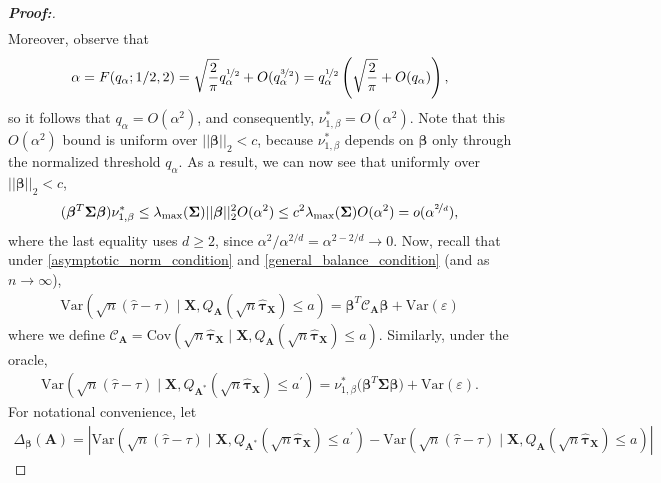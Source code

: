 \documentclass[11pt,twoside]{article}
\theoremstyle{definition}
\theoremstyle{remark}
\begin{document}
\begin{proof}[\textbf{Proof:}]
\begin{align*}
\end{align*}
Moreover, observe that
\begin{align*}
     \alpha = F(q_\alpha;1/2,2) = \sqrt{\frac{2}{\pi}}q_\alpha^{\nicefrac{1}{2}} + O(q_\alpha^{\nicefrac{3}{2}}) = q_\alpha^{\nicefrac{1}{2}} \left( \sqrt{\frac{2}{\pi}} + O(q_\alpha) \right),
\end{align*}
so it follows that $q_\alpha=O(\alpha^2)$, and consequently, $\nu^*_{1,\beta}=O(\alpha^2)$. Note that this $O(\alpha^2)$ bound is uniform over $||\bm{\beta}||_2<c$, because $\nu^*_{1,\beta}$ depends on $\bm{\beta}$ only through the normalized
threshold $q_\alpha$. As a result, we can now see that uniformly over $|| \bm{\beta}||_2 < c$,
\begin{align*}
    (\bm{\beta}^T \mathbf{\Sigma} \bm{\beta})\nu^*_{1,\beta} \leq \lambda_{\max}(\mathbf{\Sigma}) ||\bm{\beta}||_2^2 O(\alpha^2) \notag \leq c^2\lambda_{\max}(\mathbf{\Sigma})O(\alpha^2) = o(\alpha^{\nicefrac{2}{d}}),
\end{align*}
where the last equality uses $d\geq2$, since $\alpha^2/\alpha^{2/d}=\alpha^{2-2/d}\to0$. Now, recall that under \cref{asymptotic_norm_condition} and \cref{general_balance_condition} (and as $n \to \infty$),
\begin{align*}
    \text{Var}\left(\sqrt{n}(\widehat{\tau} - \tau) \mid \mathbf{X}, Q_{\mathbf{A}}(\sqrt{n} \widehat{\bm{\tau}}_{\mathbf{X}}) \leq a \right) = \bm{\beta}^T \mathcal{C}_{\mathbf{A}} \bm{\beta} + \text{Var}( \varepsilon )
\end{align*}
where we define $\mathcal{C}_{\mathbf{A}} = \text{Cov}\left( \sqrt{n} \widehat{\bm{\tau}}_{\mathbf{X}} \mid \mathbf{X}, Q_{\mathbf{A}}(\sqrt{n} \widehat{\bm{\tau}}_{\mathbf{X}}) \leq a  \right)$. Similarly, under the oracle,
\begin{align*}
    \text{Var}\left(\sqrt{n}(\widehat{\tau} - \tau) \mid \mathbf{X}, Q_{\mathbf{A}^*}(\sqrt{n} \widehat{\bm{\tau}}_{\mathbf{X}}) \leq a^\prime \right) = \nu^*_{1,\beta} \big( \bm{\beta}^T \mathbf{\Sigma} \bm{\beta}\big) + \text{Var}( \varepsilon ).
\end{align*}
For notational convenience, let
\begin{align*}
    \Delta_{\bm{\beta}}(\mathbf{A}) = \left| \text{Var}\!\left( \sqrt{n}(\widehat{\tau}-\tau) \mid \mathbf{X}, Q_{\mathbf{A}^*} (\sqrt{n}\widehat{\bm{\tau}}_{\mathbf{X}}) \leq
a^\prime\right) - \text{Var}\!\left( \sqrt{n}(\widehat{\tau}-\tau) \mid \mathbf{X}, Q_{\mathbf{A}} (\sqrt{n}\widehat{\bm{\tau}}_{\mathbf{X}}) \leq
a \right) \right|
\end{align*}

\end{proof}
\end{document}
